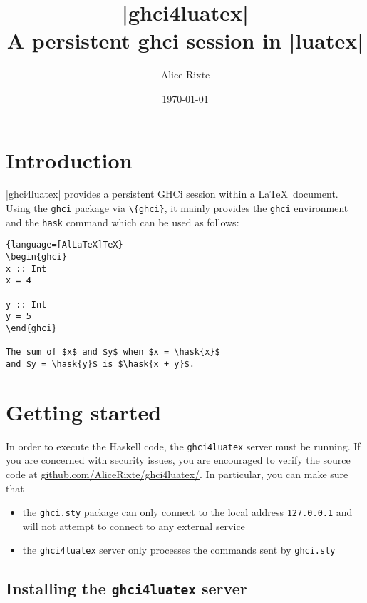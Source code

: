 \documentclass{article}
\date{\today \\[0.5em]\normalsize \texttt{\version}}
\title{|ghci4luatex| \\ \vspace{0.4em}
  \large A persistent ghci session in |luatex|}
\author{Alice Rixte}
\begin{document}
\maketitle
\tableofcontents

\newpage

\section{Introduction}


|ghci4luatex| provides a persistent GHCi session within a \LaTeX\ document. Using the \texttt{ghci} package via \texttt{\textbackslash {}\{ghci\}}, it mainly provides the \texttt{ghci} environment and the \texttt{hask} command which can be used as follows:

\begin{latexbox}
  \begin{lstlisting}{language=[AlLaTeX]TeX}
\begin{ghci}
x :: Int
x = 4

y :: Int
y = 5
\end{ghci}

The sum of $x$ and $y$ when $x = \hask{x}$
and $y = \hask{y}$ is $\hask{x + y}$.

\end{lstlisting}
\end{latexbox}

\section{Getting started}

In order to execute the Haskell code, the \texttt{ghci4luatex} server must be running. If you are concerned with security issues, you are encouraged to verify the source code at \href{https://github.com/AliceRixte/ghci4luatex/}{github.com/AliceRixte/ghci4luatex/}. In particular, you can make sure that

\begin{itemize}
  \item  the \texttt{ghci.sty} package can only connect to the local address \texttt{127.0.0.1} and will not attempt to connect to any external service
  \item the \texttt{ghci4luatex} server only processes the commands sent by \texttt{ghci.sty}
\end{itemize}

\subsection{Installing the \texttt{ghci4luatex} server}
\end{document}
